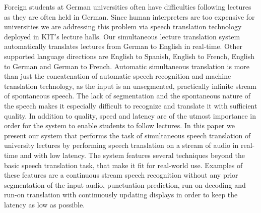 Foreign students at German universities often have difficulties following lectures as they are often held in German. Since human interpreters are too expensive for universities we are addressing this problem via speech translation technology deployed in KIT's lecture halls. Our simultaneous lecture translation system automatically translates lectures from German to English in real-time. Other supported language directions are English to Spanish, English to French, English to German and German to French. Automatic simultaneous translation is more than just the concatenation of automatic speech recognition and machine translation technology, as the input is an unsegmented, practically infinite stream of spontaneous speech. The lack of segmentation and the spontaneous nature of the speech makes it especially difficult to recognize and translate it with sufficient quality. In addition to quality, speed and latency are of the utmost importance in order for the system to enable students to follow lectures. In this paper we present our system that performs the task of simultaneous speech translation of university lectures by performing speech translation on a stream of audio in real-time and with low latency. The system features several techniques beyond the basic speech translation task, that make it fit for real-world use. Examples of these features are a continuous stream speech recognition without any prior segmentation of the input audio, punctuation prediction, run-on decoding and run-on translation with continuously updating displays in order to keep the latency as low as possible.
